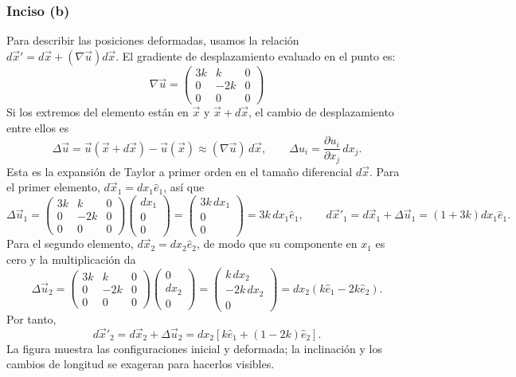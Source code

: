 \documentclass[a4paper]{article}
\begin{document}
\subsubsection*{Inciso (b)}
Para describir las posiciones deformadas, usamos la relación $d\vec{x}' = d\vec{x} + (\nabla \vec{u}) d\vec{x}$. El gradiente de desplazamiento evaluado en el punto es:
$$ \nabla \vec{u} = \begin{pmatrix} 3k & k & 0 \\ 0 & -2k & 0 \\ 0 & 0 & 0 \end{pmatrix} $$
Si los extremos del elemento están en $\vec{x}$ y $\vec{x}+d\vec{x}$, el cambio de desplazamiento entre ellos es
$$
\Delta\vec{u}=\vec{u}(\vec{x}+d\vec{x})-\vec{u}(\vec{x})
\approx(\nabla\vec{u})\,d\vec{x},
\qquad
\Delta u_i=\frac{\partial u_i}{\partial x_j}\,dx_j.
$$
Esta es la expansión de Taylor a primer orden en el tamaño diferencial $d\vec{x}$. Para el primer elemento, $d\vec{x}_1=dx_1\hat e_1$, así que
$$
\Delta\vec{u}_1
=\begin{pmatrix}3k&k&0\\0&-2k&0\\0&0&0\end{pmatrix}
\begin{pmatrix}dx_1\\0\\0\end{pmatrix}
=\begin{pmatrix}3k\,dx_1\\0\\0\end{pmatrix}
=3k\,dx_1\hat e_1,
\qquad
d\vec{x}'_1=d\vec{x}_1+\Delta\vec{u}_1=(1+3k)dx_1\hat e_1.
$$
Para el segundo elemento, $d\vec{x}_2=dx_2\hat e_2$, de modo que su componente en $x_1$ es cero y la multiplicación da
$$
\Delta\vec{u}_2
=\begin{pmatrix}3k&k&0\\0&-2k&0\\0&0&0\end{pmatrix}
\begin{pmatrix}0\\dx_2\\0\end{pmatrix}
=\begin{pmatrix}k\,dx_2\\-2k\,dx_2\\0\end{pmatrix}
=dx_2(k\hat e_1-2k\hat e_2).
$$
Por tanto,
$$
d\vec{x}'_2=d\vec{x}_2+\Delta\vec{u}_2
=dx_2\left[k\hat e_1+(1-2k)\hat e_2\right].
$$
La figura muestra las configuraciones inicial y deformada; la inclinación y los cambios de longitud se exageran para hacerlos visibles.

\end{document}
